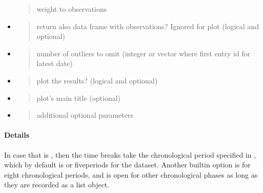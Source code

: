 \documentclass[a4paper,12pt,english]{sphinxhowto}
\begin{document}
\begin{itemize}
\begin{quote}
weight to observations
\end{quote}

\item {} 
\begin{quote}

return also data frame with observations? Ignored for plot (logical and optional)
\end{quote}

\item {} 
\begin{quote}

number of outliers to omit (integer or vector where first entry id for latest date)
\end{quote}

\item {} 
\begin{quote}

plot the results? (logical and optional)
\end{quote}

\item {} 
\begin{quote}

plot’s main title (optional)
\end{quote}

\item {} 
\begin{quote}

additional optional parameters
\end{quote}

\end{itemize}



\paragraph{Details}
\label{\detokenize{Uncertainty:details}}
In case that  is , then the time breaks take the chronological period specified in , which by
default is  or five\sphinxhyphen{}periods for the  dataset. Another built\sphinxhyphen{}in option is  for eight
chronological periods, and  is open for other chronological phases as long as they are recorded as a list object.
\end{document}
